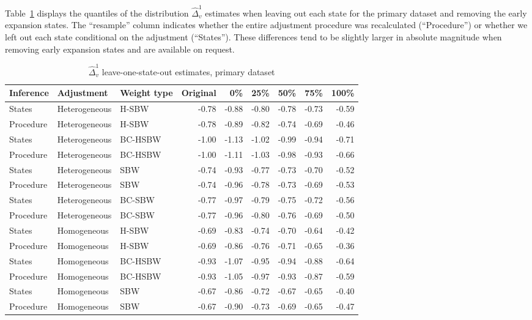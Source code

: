 Table~\ref{tab:rdiffc1} displays the quantiles of the distribution $\hat{\Delta}_v^1$ estimates when leaving out each state for the primary dataset and removing the early expansion states. The ``resample'' column indicates whether the entire adjustment procedure was recalculated (``Procedure'') or whether we left out each state conditional on the adjustment (``States''). These differences tend to be slightly larger in absolute magnitude when removing early expansion states and are available on request.

\begin{table}[h!]
\centering
\caption{$\hat{\Delta}^1_v$ leave-one-state-out estimates, primary dataset}
\label{tab:rdiffc1}
\begin{tabular}{lllrrrrrr}
  \hline
Inference & Adjustment & Weight type & Original & 0\% & 25\% & 50\% & 75\% & 100\% \\ 
  \hline
States & Heterogeneous & H-SBW & -0.78 & -0.88 & -0.80 & -0.78 & -0.73 & -0.59 \\ 
  Procedure & Heterogeneous & H-SBW & -0.78 & -0.89 & -0.82 & -0.74 & -0.69 & -0.46 \\ 
  States & Heterogeneous & BC-HSBW & -1.00 & -1.13 & -1.02 & -0.99 & -0.94 & -0.71 \\ 
  Procedure & Heterogeneous & BC-HSBW & -1.00 & -1.11 & -1.03 & -0.98 & -0.93 & -0.66 \\ 
  States & Heterogeneous & SBW & -0.74 & -0.93 & -0.77 & -0.73 & -0.70 & -0.52 \\ 
  Procedure & Heterogeneous & SBW & -0.74 & -0.96 & -0.78 & -0.73 & -0.69 & -0.53 \\ 
  States & Heterogeneous & BC-SBW & -0.77 & -0.97 & -0.79 & -0.75 & -0.72 & -0.56 \\ 
  Procedure & Heterogeneous & BC-SBW & -0.77 & -0.96 & -0.80 & -0.76 & -0.69 & -0.50 \\ 
  States & Homogeneous & H-SBW & -0.69 & -0.83 & -0.74 & -0.70 & -0.64 & -0.42 \\ 
  Procedure & Homogeneous & H-SBW & -0.69 & -0.86 & -0.76 & -0.71 & -0.65 & -0.36 \\ 
  States & Homogeneous & BC-HSBW & -0.93 & -1.07 & -0.95 & -0.94 & -0.88 & -0.64 \\ 
  Procedure & Homogeneous & BC-HSBW & -0.93 & -1.05 & -0.97 & -0.93 & -0.87 & -0.59 \\ 
  States & Homogeneous & SBW & -0.67 & -0.86 & -0.72 & -0.67 & -0.65 & -0.40 \\ 
  Procedure & Homogeneous & SBW & -0.67 & -0.90 & -0.73 & -0.69 & -0.65 & -0.47 \\ 

\end{tabular}
\end{table}
